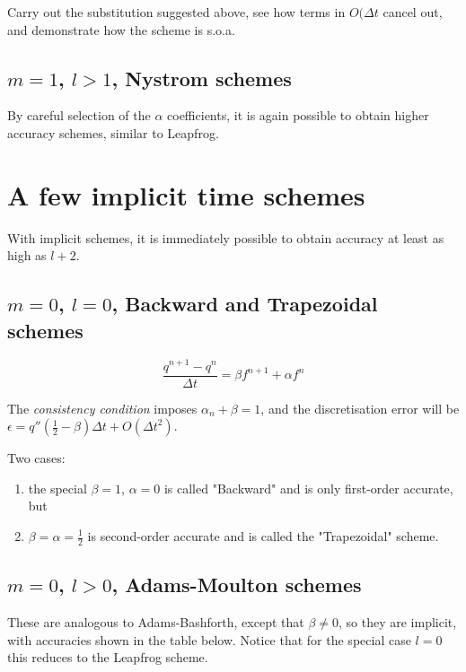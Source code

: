 \begin{exercise}
Carry out the substitution suggested above, see how terms in $O({\Delta t}$ cancel out, and demonstrate how the scheme is s.o.a.
\end{exercise}

\subsection{$m=1$, $l>1$, Nystrom schemes}
By careful selection of the $\alpha$ coefficients, it is again possible to obtain higher accuracy schemes, similar to Leapfrog.

\section{A few implicit time schemes}
With implicit schemes, it is immediately possible to obtain accuracy at least as high as $l+2$.

\subsection{$m=0$, $l=0$, Backward and Trapezoidal schemes}\label{section:implicit}

\begin{equation}
	\frac{q^{n+1}-q^{n}}{\Delta t} = \beta f^{n+1} + \alpha f^n
	\label{Implicit}
\end{equation}

The \emph{consistency condition} imposes $\alpha_n + \beta =1$, and the discretisation error will be $\epsilon = q'' \left( \frac{1}{2} -\beta \right) \Delta t + O({\Delta t}^2)$.

Two cases: 
\begin{enumerate}
\item the special $\beta = 1$, $\alpha=0$ is called "Backward" and is only first-order accurate, but 
\item $\beta = \alpha=\frac{1}{2}$ is second-order accurate and is called the "Trapezoidal" scheme.
\end{enumerate}

\subsection{$m=0$, $l>0$, Adams-Moulton schemes}
These are analogous to Adams-Bashforth, except that $\beta \ne 0$, so they are implicit, with accuracies shown in the table below. Notice that for the special case $l=0$ this reduces to the Leapfrog scheme.

